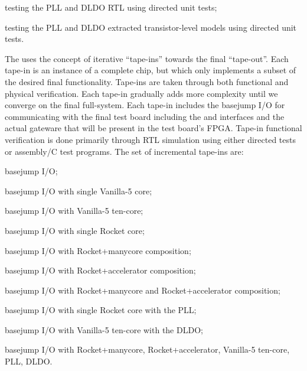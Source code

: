 \begin{cbxlist}{1.5em}{1em}{1em}
\begin{cbxlist}[--]{1.5em}{0em}{0em}
      \item testing the PLL and DLDO RTL using directed unit tests;

      \item testing the PLL and DLDO extracted transistor-level models
         using directed unit tests.

    \end{cbxlist}

 \item The  uses the
    concept of iterative ``tape-ins'' towards the final ``tape-out''.
    Each tape-in is an instance of a complete chip, but which only
    implements a subset of the desired final functionality. Tape-ins are
    taken through both functional and physical verification. Each tape-in
    gradually adds more complexity until we converge on the final
    full-system. Each tape-in includes the basejump I/O for communicating
    with the final test board including the  and
     interfaces and the actual gateware that will be present
    in the test board's FPGA. Tape-in functional verification is done
    primarily through RTL simulation using either directed tests or
    assembly/C test programs. The set of incremental tape-ins are:

    \smallskip
    \begin{cbxlist}[--]{1.5em}{0em}{0em}
      \raggedright

      \item basejump I/O;
      \item basejump I/O with single Vanilla-5 core;
      \item basejump I/O with Vanilla-5 ten-core;
      \item basejump I/O with single Rocket core;
      \item basejump I/O with Rocket+manycore composition;
      \item basejump I/O with Rocket+accelerator composition;
      \item basejump I/O with Rocket+manycore and Rocket+accelerator composition;
      \item basejump I/O with single Rocket core with the PLL;
      \item basejump I/O with Vanilla-5 ten-core with the DLDO;
      \item basejump I/O with Rocket+manycore, Rocket+accelerator,
         Vanilla-5 ten-core, PLL, DLDO.

    \end{cbxlist}


\end{cbxlist}
